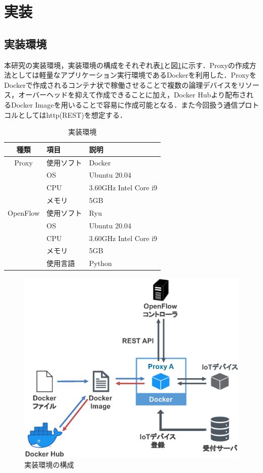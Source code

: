 \documentclass[Japanese]{dicomopapers}
\begin{document}
\section{実装}
\subsection{実装環境}
本研究の実装環境，実装環境の構成をそれぞれ表\ref{tab:program}と図\ref{fig:program}に示す．Proxyの作成方法としては軽量なアプリケーション実行環境であるDockerを利用した．ProxyをDockerで作成されるコンテナ状で稼働させることで複数の論理デバイスをリソース，オーバーヘッドを抑えて作成できることに加え，Docker Hubより配布されるDocker Imageを用いることで容易に作成可能となる．また今回扱う通信プロトコルとしてはhttp(REST)を想定する．

\begin{table}[!bt]
	\caption{実装環境}
	\label{tab:program}
	\centering
	\begin{tabular}{|c|l|l|}
		\hline
		種類     & 項目       & 説明                  \\
		\hline \hline
		Proxy    & 使用ソフト & Docker                \\
		         & OS         & Ubuntu 20.04          \\
		         & CPU        & 3.60GHz Intel Core i9 \\
		         & メモリ     & 5GB                   \\
		\hline
		OpenFlow & 使用ソフト & Ryu                   \\
		         & OS         & Ubuntu 20.04          \\
		         & CPU        & 3.60GHz Intel Core i9 \\
		         & メモリ     & 5GB                   \\
		         & 使用言語   & Python                \\
		\hline
	\end{tabular}
\end{table}

\begin{figure}[!tb]
	\centering
	\includegraphics[width=\linewidth]{img/program.eps}
	\caption{実装環境の構成}
	\label{fig:program}
\end{figure}
\end{document}
